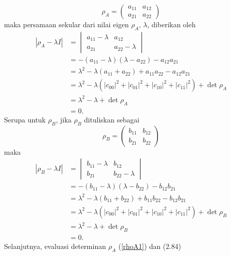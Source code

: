 \begin{equation}
	\rho_{A}=
	\begin{pmatrix}
		a_{11}&a_{12}\\
		a_{21}&a_{22}
	\end{pmatrix}\label{rhoA1}
\end{equation}
maka persamaan sekular dari nilai eigen $\rho_{A}$, $\lambda$, diberikan oleh
\begin{equation}
	\begin{aligned}
		|\rho_{A}-\lambda I|
		&=\begin{vmatrix}
			a_{11}-\lambda&a_{12}\\
			a_{21}&a_{22}-\lambda
		\end{vmatrix}\\
		&=-(a_{11}-\lambda)(\lambda-a_{22})-a_{12}a_{21}\\
		&=\lambda^2-\lambda(a_{11}+a_{22})+a_{11}a_{22}-a_{12}a_{21}\\
		&=\lambda^2-\lambda(|c_{00}|^2+|c_{01}|^2+|c_{10}|^2+|c_{11}|^2)+\det\rho_{A}\\
		&=\lambda^2-\lambda+\det\rho_{A}\\
		&=0.
	\end{aligned}
\end{equation}
Serupa untuk $\rho_{B}$, jika $\rho_{B}$ dituliskan sebagai
\begin{equation}
	\rho_{B}=
	\begin{pmatrix}
		b_{11}&b_{12}\\
		b_{21}&b_{22}
	\end{pmatrix}
\end{equation}
maka
\begin{equation}
	\begin{aligned}
		|\rho_{B}-\lambda I|
		&=\begin{vmatrix}
			b_{11}-\lambda&b_{12}\\
			b_{21}&b_{22}-\lambda
		\end{vmatrix}\\
		&=-(b_{11}-\lambda)(\lambda-b_{22})-b_{12}b_{21}\\
		&=\lambda^2-\lambda(b_{11}+b_{22})+b_{11}b_{22}-b_{12}b_{21}\\
		&=\lambda^2-\lambda(|c_{00}|^2+|c_{01}|^2+|c_{10}|^2+|c_{11}|^2)+\det\rho_{B}\\
		&=\lambda^2-\lambda+\det\rho_{B}\\
		&=0.
	\end{aligned}
\end{equation}
Selanjutnya, evaluasi determinan $\rho_{A}$ (\ref{rhoA1}) dan (2.84)

